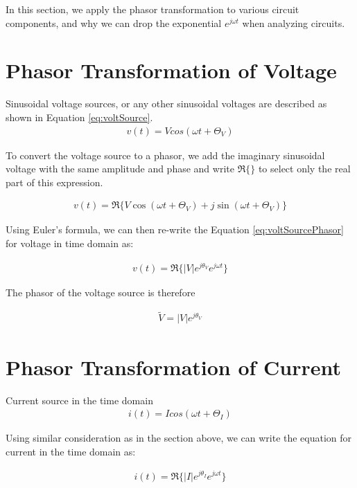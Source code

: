 \documentclass{ximera}
\begin{document}
In this section, we apply the phasor transformation to various circuit components, and why we can drop the exponential $e^{j\omega t}$ when analyzing circuits.


\section{Phasor Transformation of Voltage}


Sinusoidal voltage sources, or any other sinusoidal voltages are described as shown in Equation \ref{eq:voltSource}.
\begin{eqnarray}
v(t)= V cos (\omega t + \Theta_{V} ) \label{eq:voltSource}
\end{eqnarray}

To convert the voltage source to a phasor, we add the imaginary sinusoidal voltage with the same amplitude and phase and write $\Re\{\}$ to select only the real part of this expression.


\begin{eqnarray}
v(t)= \Re \{V \cos (\omega t + \Theta_{V} )+ j \sin (\omega t + \Theta_{V} ) \} \label{eq:voltSourcePhasor}
\end{eqnarray}

Using Euler's formula, we can then re-write the Equation \ref{eq:voltSourcePhasor} for voltage in time domain as:


\begin{eqnarray}
v(t)=\Re\{|V|e^{j\theta_{V}} e^{j \omega t}\}\label{eq:VoltageDef}
\end{eqnarray}

The phasor of the voltage source is therefore

\begin{eqnarray}
\tilde{V}=|V|e^{j\theta_{V}} 
\end{eqnarray}



\section{Phasor Transformation of  Current}

Current source in the time domain 
\begin{eqnarray}
i(t)= I cos (\omega t + \Theta_{I} ) 
\end{eqnarray}


Using similar consideration as in the section above, we can write the equation for current in the time domain as: 


\begin{eqnarray}
i(t)=\Re\{|I|e^{j\theta_{I}} e^{j \omega t}\}\label{eq:PhCurrentDef} 
\end{eqnarray}
\end{document}
